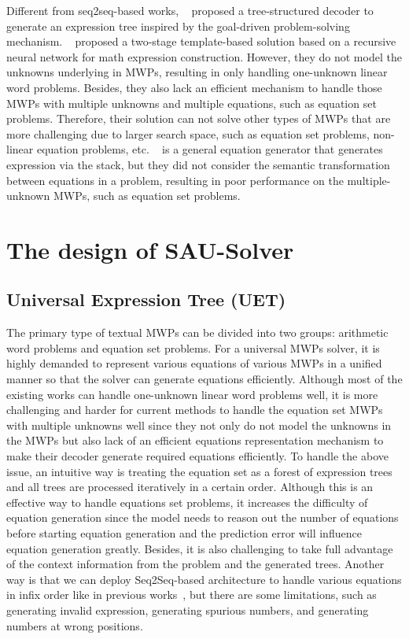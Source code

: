 \documentclass[11pt,a4paper]{article}
\begin{document}
Different from seq2seq-based works, ~\cite{seq2tree} proposed a tree-structured decoder to generate an expression tree inspired by the goal-driven problem-solving mechanism. ~\cite{trnn} proposed a two-stage template-based solution based on a recursive neural network for math expression construction. However, they do not model the unknowns underlying in MWPs, resulting in only handling one-unknown linear word problems. Besides, they also lack an efficient mechanism to handle those MWPs with multiple unknowns and multiple equations, such as equation set problems. Therefore, their solution can not solve other types of MWPs that are more challenging due to larger search space, such as equation set problems, non-linear equation problems, etc. ~\cite{stackdecoder} is a general equation generator that generates expression via the stack, but they did not consider the semantic transformation between equations in a problem, resulting in poor performance on the multiple-unknown MWPs, such as equation set problems.

\section{The design of SAU-Solver}
\subsection{Universal Expression Tree (UET)}
The primary type of textual MWPs can be divided into two groups: arithmetic word problems and equation set problems. For a universal MWPs solver, it is highly demanded to represent various equations of various MWPs in a unified manner so that the solver can generate equations efficiently. Although most of the existing works can handle one-unknown linear word problems well, it is more challenging and harder for current methods to handle the equation set MWPs with multiple unknowns well since they not only do not model the unknowns in the MWPs but also lack of an efficient equations representation mechanism to make their decoder generate required equations efficiently. To handle the above issue, an intuitive way is treating the equation set as a forest of expression trees and all trees are processed iteratively in a certain order. Although this is an effective way to handle equations set problems, it increases the difficulty of equation generation since the model needs to reason out the number of equations before starting equation generation and the prediction error will influence equation generation greatly. Besides, it is also challenging to take full advantage of the context information from the problem and the generated trees. Another way is that we can deploy Seq2Seq-based architecture to handle various equations in infix order like in previous works~\cite{dns,cass}, but there are some limitations, such as generating invalid expression, generating spurious numbers, and generating numbers at wrong positions.
\end{document}
